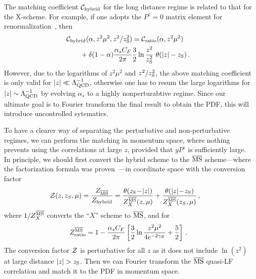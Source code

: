 The matching coefficient ${\cal C}_{\rm hybrid}$ for the long distance regime is related to that for the X-scheme. For example, if one adopts the $P^z=0$ matrix element for renormalization~\cite{Zhang:2018ggy,Radyushkin:2017lvu,Izubuchi:2018srq}, then
\begin{align}\label{eq:hybridm1}
&{\cal C}_{\rm hybrid}(\alpha, z^2\mu^2, z^2/z_{\rm S}^2) = {\cal C}_{\rm ratio}(\alpha, z^2\mu^2) \nonumber\\
&\qquad + \delta(1-\alpha){\alpha_sC_F\over 2\pi}{3\over 2} \ln {z^2\over z_{\rm S}^2}\ \theta(|z|-z_{\rm S})\,.
\end{align}
 However, due to the logarithms of $z^2\mu^2$ and $z^2/z_{\rm S}^2$, the above matching coefficient is only valid for $|z| \ll \Lambda_{\rm QCD}^{-1}$, otherwise one has to resum the large logarithms for $|z|\sim \Lambda_{\rm QCD}^{-1}$ by evolving $\alpha_s$ to a highly nonperturabtive regime. Since our ultimate goal is to Fourier transform the final result to obtain the PDF, this will introduce uncontrolled sytematics.

To have a clearer way of separating the perturbative and non-perturbative regimes, we can perform the matching in momentum space, where nothing prevents using the correlations at large $z$, provided that $yP^z$ is sufficiently large. In principle, we should first convert the hybrid scheme to the ${\overline{\rm MS}}$ scheme---where the factorization formula was proven~\cite{Ma:2014jla,Ji:2020ect}---in coordinate space with the conversion factor
\begin{align}\label{eq:hybrid3}
    {\cal Z}(z,z_S,\mu) & = {Z_{{\overline{\rm MS}}}\over Z_{\rm hybrid}} =\frac{\theta(z_{\rm S}\!-\!|z|)}{Z^{\overline{\rm MS}}_{X}(z,\mu)}
    +\frac{\theta(|z|\!-\! z_{\rm S})}{Z^{\overline{\rm MS}}_{X}(z_S,\mu)}\,,
\end{align}
where $1/Z^{\overline{\rm MS}}_{X}$ converts the ``$X$'' scheme to ${\overline{\rm MS}}$, and for 
\begin{align}\label{eq:zmsr}
    Z^{\overline{\rm MS}}_{\rm ratio} = 1 - {\alpha_sC_F\over 2\pi}\left[{3\over 2}\ln{z^2\mu^2\over 4e^{-2\gamma_E}}+ {5\over2}\right]\,.
\end{align}
The conversion factor ${\cal Z}$ is perturbative for all $z$ as it does not include $\ln(z^2)$ at large distance $|z|>z_{\rm S}$. Then we can Fourier transform the ${\overline{\rm MS}}$ quasi-LF correlation and match it to the PDF in momentum space.

